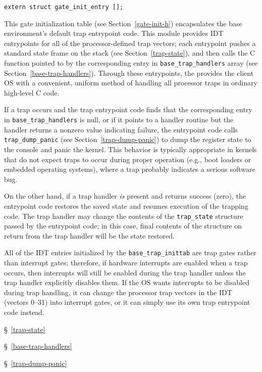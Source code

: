\label{base-trap-inittab}
\begin{apisyn}

	{\tt extern struct gate_init_entry [];}
\end{apisyn}
\begin{apidesc}
	This gate initialization table (see Section~\ref{gate-init-h})
	encapsulates the base environment's default trap entrypoint code.
	This module provides IDT entrypoints
	for all of the processor-defined trap vectors;
	each entrypoint pushes a standard state frame on the stack
	(see Section~\ref{trap-state}),
	and then calls the C function pointed to
	by the corresponding entry in {\tt base_trap_handlers} array
	(see Section~\ref{base-trap-handlers}).
	Through these entrypoints, the \oskit{} provides the client OS
	with a convenient, uniform method of handling all processor traps
	in ordinary high-level C code.

	If a trap occurs and the trap entrypoint code
	finds that the corresponding entry in {\tt base_trap_handlers} is null,
	or if it points to a handler routine
	but the handler returns a nonzero value indicating failure,
	the entrypoint code calls {\tt trap_dump_panic}
	(see Section~\ref{trap-dump-panic})
	to dump the register state to the console and panic the kernel.
	This behavior is typically appropriate
	in kernels that do not expect traps to occur during proper operation
	(e.g., boot loaders or embedded operating systems),
	where a trap probably indicates a serious software bug.

	On the other hand, if a trap handler
	\emph{is} present and returns success (zero),
	the entrypoint code restores the saved state
	and resumes execution of the trapping code.
	The trap handler may change the contents
	of the {\tt trap_state} structure passed by the entrypoint code;
	in this case, final contents of the structure
	on return from the trap handler
	will be the state restored.

	All of the IDT entries initialized by the {\tt base_trap_inittab}
	are trap gates rather than interrupt gates;
	therefore, if hardware interrupts are enabled when a trap occurs,
	then interrupts will still be enabled during the trap handler
	unless the trap handler explicitly disables them.
	If the OS wants interrupts to be disabled during trap handling,
	it can change the processor trap vectors in the IDT (vectors 0--31)
	into interrupt gates,
	or it can simply use its own trap entrypoint code instead.
\end{apidesc}
\begin{apidep}
	\item[struct trap_state]	\S~\ref{trap-state}
	\item[base_trap_handlers]	\S~\ref{base-trap-handlers}
	\item[trap_dump_panic]		\S~\ref{trap-dump-panic}
\end{apidep}

